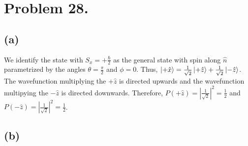 \documentclass[12pt]{extarticle}
\begin{document}
 
\section*{Problem 28.}

\subsection*{(a)}

We identify the state with $S_x = + \frac{\hbar}{2}$ as the general state with spin along $\hat{n}$ parametrized by the angles $\theta = \frac{\pi}{2}$ and $\phi = 0$. Thus, $\left| + \hat{x} \right> = \frac{1}{\sqrt{2}} \left| + \hat{z} \right> + \frac{1}{\sqrt{2}} \left| - \hat{z} \right>$. The wavefunction multiplying the $+\hat{z}$ is directed upwards and the wavefunction multipying the $-\hat{z}$ is directed downwards. Therefore, $P(+\hat{z}) = \left|\frac{1}{\sqrt{2}}\right|^2 = \frac{1}{2}$ and $P(-\hat{z}) = \left|\frac{1}{\sqrt{2}}\right|^2 = \frac{1}{2}$. 

\subsection*{(b)}
\end{document}
